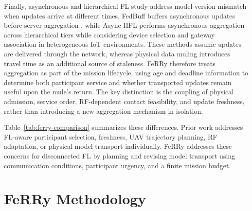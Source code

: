 \documentclass[conference]{IEEEtran}
\newcommand{\sysname}{FeRRy}
\begin{document}
Finally, asynchronous and hierarchical FL study address model-version mismatch when
updates arrive at different times. FedBuff buffers asynchronous updates before
server aggregation \cite{nguyen2022federated}, while Async-HFL performs
asynchronous aggregation across hierarchical tiers while considering device
selection and gateway association in heterogeneous IoT environments\cite{yu2023async}. These methods assume updates are delivered through the network, whereas physical data muling introduces travel time as an additional source of staleness. \sysname{} therefore treats aggregation as part of the mission lifecycle, using age and deadline information to determine both participant service and whether transported updates remain useful upon the mule’s return. The key distinction is the coupling of physical admission, service order, RF-dependent contact feasibility, and update freshness, rather than introducing a new aggregation mechanism in isolation.

Table~\ref{tab:ferry-comparison} summarizes these differences. Prior work
addresses FL-aware participant selection, freshness, UAV trajectory planning,
RF adaptation, or physical model transport individually. \sysname{} addresses these
concerns for disconnected FL by planning and revising model transport using
communication conditions, participant urgency, and a finite mission budget.

\section{\sysname{} Methodology}
\label{sec:method}


\end{document}
